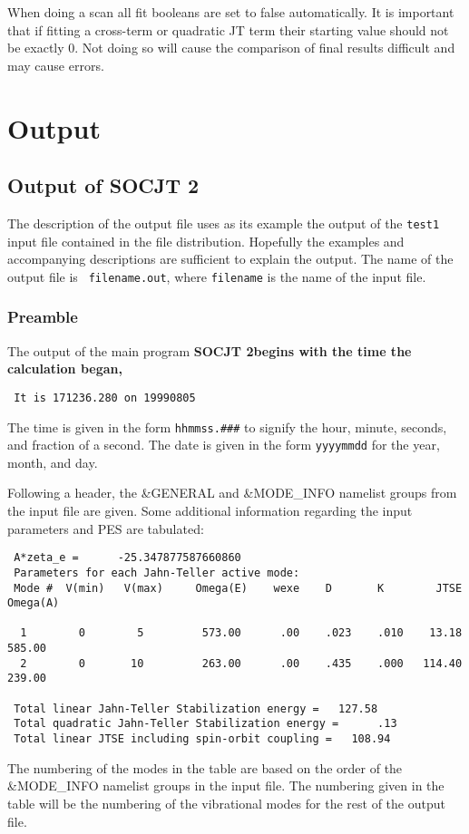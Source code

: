 \documentclass{article}
\newcommand{\socjttwo}{\bf{SOCJT 2}}
\begin{document}
When doing a scan all fit booleans are set to false automatically. It is important
that if fitting a cross-term or quadratic JT term their starting value should not
be exactly 0. Not doing so will cause the comparison of final results difficult and may
cause errors.

\section{Output} \label{section:output}

\subsection{Output of \socjttwo }

The description of the output file uses as its example the output of
the {\tt test1} input file contained in the file
distribution. Hopefully the examples and accompanying descriptions are
sufficient to explain the output. The name of the output file is {\tt
  filename.out}, where {\tt filename} is the name of the input file.

\subsubsection{Preamble}

The output of the main program \socjttwo begins with the time the
calculation began,
\begin{verbatim}
 It is 171236.280 on 19990805
\end{verbatim}
The time is given in the form {\tt hhmmss.\#\#\#} to signify the
hour, minute, seconds, and fraction of a second. The date is given in
the form {\tt yyyymmdd} for the year, month, and day.

Following a header, the \&GENERAL and \&MODE\_INFO namelist groups
from the input file are given. Some additional information regarding
the input parameters and PES are tabulated:
\begin{verbatim}
 A*zeta_e =      -25.347877587660860
 Parameters for each Jahn-Teller active mode:
 Mode #  V(min)   V(max)     Omega(E)    wexe    D       K        JTSE  Omega(A)
 
  1        0        5         573.00      .00    .023    .010    13.18    585.00
  2        0       10         263.00      .00    .435    .000   114.40    239.00
 
 Total linear Jahn-Teller Stabilization energy =   127.58
 Total quadratic Jahn-Teller Stabilization energy =      .13
 Total linear JTSE including spin-orbit coupling =   108.94
\end{verbatim}
The numbering of the modes in the table are based on the order of the
\&MODE\_INFO namelist groups in the input file. The numbering given in
the table will be the numbering of the vibrational modes for the rest
of the output file.
\end{document}
